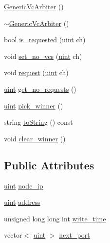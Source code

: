 \begin{CompactItemize}
\hyperlink{classGenericVcArbiter_8ad20b81e2a38303b310d15e1dcc9947}{GenericVcArbiter} ()
\item 
\hyperlink{classGenericVcArbiter_da76ff9f227949f97ecd02d1bf89b5c8}{$\sim$GenericVcArbiter} ()
\item 
bool \hyperlink{classGenericVcArbiter_bea0f63a51a1bfbfe7bd3a3ee0b95b48}{is\_\-requested} (\hyperlink{outputBuffer_8h_91ad9478d81a7aaf2593e8d9c3d06a14}{uint} ch)
\item 
void \hyperlink{classGenericVcArbiter_ec3307aa2de2dd6c8776102a950a4783}{set\_\-no\_\-vcs} (\hyperlink{outputBuffer_8h_91ad9478d81a7aaf2593e8d9c3d06a14}{uint} ch)
\item 
void \hyperlink{classGenericVcArbiter_d12300373b6f551c32cde524b0e35315}{request} (\hyperlink{outputBuffer_8h_91ad9478d81a7aaf2593e8d9c3d06a14}{uint} ch)
\item 
\hyperlink{outputBuffer_8h_91ad9478d81a7aaf2593e8d9c3d06a14}{uint} \hyperlink{classGenericVcArbiter_0648f3756140fa6acc1e9345015b3461}{get\_\-no\_\-requests} ()
\item 
\hyperlink{outputBuffer_8h_91ad9478d81a7aaf2593e8d9c3d06a14}{uint} \hyperlink{classGenericVcArbiter_55ce40bdf8fa7c2ea448ee5aa5c50921}{pick\_\-winner} ()
\item 
string \hyperlink{classGenericVcArbiter_b2b98c13d7e7c13e703845591f241e70}{toString} () const 
\item 
void \hyperlink{classGenericVcArbiter_4cd15ea7b1b8ff50cbd9148826880fdf}{clear\_\-winner} ()
\end{CompactItemize}
\subsection*{Public Attributes}
\begin{CompactItemize}
\item 
\hyperlink{outputBuffer_8h_91ad9478d81a7aaf2593e8d9c3d06a14}{uint} \hyperlink{classGenericVcArbiter_f5fe6167805ebb6bda85e58535b6f51e}{node\_\-ip}
\item 
\hyperlink{outputBuffer_8h_91ad9478d81a7aaf2593e8d9c3d06a14}{uint} \hyperlink{classGenericVcArbiter_05e08631ed998739acf72c773bfda374}{address}
\item 
unsigned long long int \hyperlink{classGenericVcArbiter_92c6b36810e3ca21255596f2fde60a96}{write\_\-time}
\item 
vector$<$ \hyperlink{outputBuffer_8h_91ad9478d81a7aaf2593e8d9c3d06a14}{uint} $>$ \hyperlink{classGenericVcArbiter_1538dd58584a6130c0846fa7da7a376d}{next\_\-port}
\end{CompactItemize}


